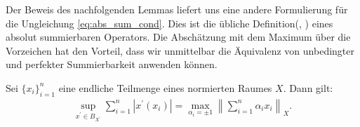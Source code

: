 Der Beweis des nachfolgenden Lemmas liefert uns eine andere Formulierung für die Ungleichung \eqref{eq:abs_sum_cond}.
Dies ist die übliche Definition(\cite{Albaic2006}, \cite{Diestel1995}) eines absolut summierbaren Operators.
Die Abschätzung mit dem Maximum über die Vorzeichen hat den Vorteil, dass wir unmittelbar die Äquivalenz von unbedingter und perfekter Summierbarkeit anwenden können. 

\begin{lem}\label{th:1_sum_equality}
	Sei $ \{x_i\}_{i=1}^n  $ eine endliche Teilmenge eines normierten Raumes $ X $.
	Dann gilt:
	\begin{align*}
		\sup \limits_{x^\prime \in B_{X^\prime}} 
		\sum \limits_{i = 1}^n
		|x^\prime(x_i)|
		=
		\max \limits_{\alpha_i = \pm 1}
		\left\|
		\sum \limits_{i=1}^n \alpha_i x_i
		\right\|_X.
	\end{align*}
\end{lem}

